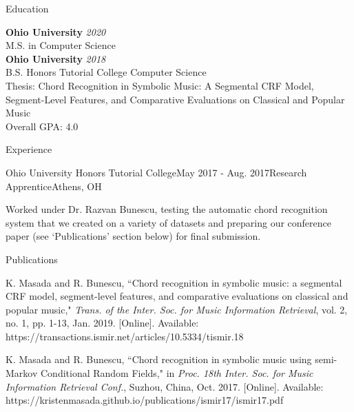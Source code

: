 \documentclass{resume} %
\begin{document}

\begin{rSection}{Education}

{\bf Ohio University} \hfill {\em 2020} \\ 
M.S. in Computer Science \\

{\bf Ohio University} \hfill {\em 2018} \\ 
B.S. Honors Tutorial College Computer Science \smallskip \\
Thesis: Chord Recognition in Symbolic Music: A Segmental CRF Model, Segment-Level Features, and Comparative Evaluations on Classical and Popular Music \\
Overall GPA: 4.0

\end{rSection}


\begin{rSection}{Experience}

\begin{rSubsection}{Ohio University Honors Tutorial College}{May 2017 - Aug. 2017}{Research Apprentice}{Athens, OH}
\item Worked under Dr. Razvan Bunescu, testing the automatic chord recognition system that we created on a variety of datasets and preparing our conference paper (see ‘Publications’ section below) for final submission.
\end{rSubsection}


\end{rSection}


\begin{rSection}{Publications}
\item K. Masada and R. Bunescu, ``Chord recognition in symbolic music: a segmental CRF model, segment-level features, and comparative evaluations on classical and popular music," {\em Trans. of the Inter. Soc. for Music Information Retrieval}, vol. 2, no. 1, pp. 1-13, Jan. 2019. [Online]. Available: https://transactions.ismir.net/articles/10.5334/tismir.18
\item K. Masada and R. Bunescu, ``Chord recognition in symbolic music using semi-Markov Conditional Random Fields," in {\em Proc. 18th Inter. Soc. for Music Information Retrieval Conf.}, Suzhou, China, Oct. 2017. [Online]. Available: https://kristenmasada.github.io/publications/ismir17/ismir17.pdf
\end{rSection}
\end{document}
